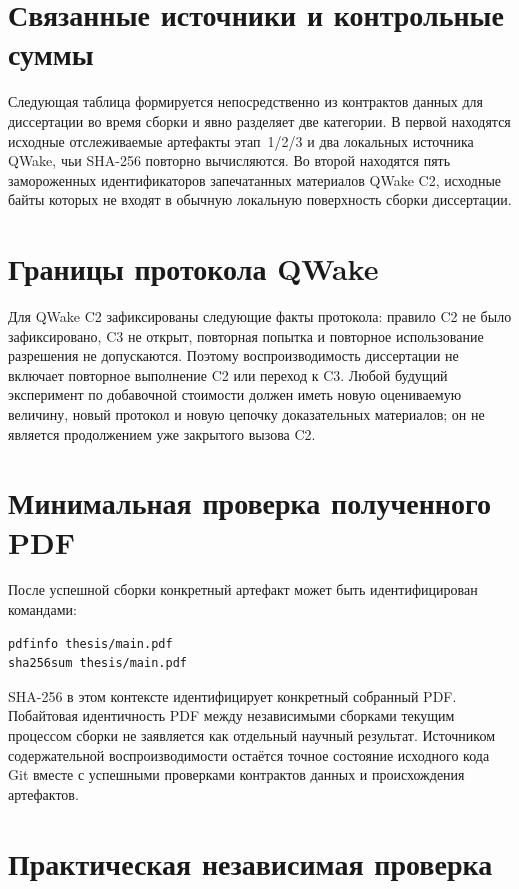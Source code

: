 \section{Связанные источники и контрольные суммы}

Следующая таблица формируется непосредственно из контрактов данных для
диссертации во время сборки и явно разделяет две категории. В первой находятся
исходные отслеживаемые артефакты этап~1/2/3 и два локальных источника QWake,
чьи SHA-256 повторно вычисляются. Во второй находятся пять замороженных
идентификаторов запечатанных материалов QWake C2, исходные байты которых не
входят в обычную локальную поверхность сборки диссертации.



\section{Границы протокола QWake}

Для QWake C2 зафиксированы следующие факты протокола: правило C2 не было
зафиксировано, C3 не открыт, повторная попытка и повторное использование
разрешения не допускаются. Поэтому воспроизводимость диссертации не включает
повторное выполнение C2 или переход к C3. Любой будущий эксперимент по
добавочной стоимости должен иметь новую оцениваемую величину, новый протокол и
новую цепочку доказательных материалов; он не является продолжением уже
закрытого вызова C2.

\section{Минимальная проверка полученного PDF}

После успешной сборки конкретный артефакт может быть идентифицирован командами:

\begin{verbatim}
pdfinfo thesis/main.pdf
sha256sum thesis/main.pdf
\end{verbatim}

SHA-256 в этом контексте идентифицирует конкретный собранный PDF. Побайтовая
идентичность PDF между независимыми сборками текущим процессом сборки не
заявляется как отдельный научный результат. Источником содержательной
воспроизводимости остаётся точное состояние исходного кода Git вместе с
успешными проверками контрактов данных и происхождения артефактов.

\section{Практическая независимая проверка}

